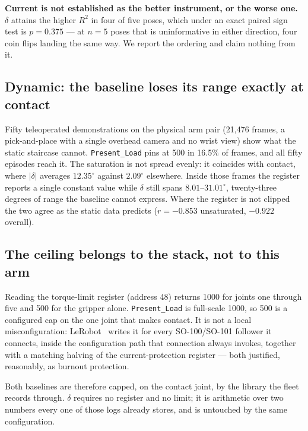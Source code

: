 \documentclass{article}
\begin{document}
\textbf{Current is not established as the better instrument, or the worse
one.} $\delta$ attains the higher $R^2$ in four of five poses, which under an
exact paired sign test is $p = 0.375$ --- at $n = 5$ poses that is
uninformative in either direction, four coin flips landing the same way. We
report the ordering and claim nothing from it.

\subsection{Dynamic: the baseline loses its range exactly at contact}

Fifty teleoperated demonstrations on the physical arm pair (21{,}476 frames,
a pick-and-place with a single overhead camera and no wrist view) show what
the static staircase cannot. \texttt{Present\_Load} pins at 500 in 16.5\% of
frames, and all fifty episodes reach it. The saturation is not spread evenly:
it coincides with contact, where $|\delta|$ averages $12.35^\circ$ against
$2.09^\circ$ elsewhere. Inside those frames the register reports a single
constant value while $\delta$ still spans $8.01$--$31.01^\circ$, twenty-three
degrees of range the baseline cannot express. Where the register is not
clipped the two agree as the static data predicts ($r = -0.853$
unsaturated, $-0.922$ overall).

\subsection{The ceiling belongs to the stack, not to this arm}

Reading the torque-limit register (address 48) returns 1000 for joints one
through five and 500 for the gripper alone. \texttt{Present\_Load} is
full-scale 1000, so 500 is a configured cap on the one joint that makes
contact. It is not a local misconfiguration: LeRobot~\citep{cadene2024lerobot}
writes it for every SO-100/SO-101 follower it connects, inside the
configuration path that connection always invokes, together with a matching
halving of the current-protection register --- both justified, reasonably, as
burnout protection.

Both baselines are therefore capped, on the contact joint, by the library the
fleet records through. $\delta$ requires no register and no limit; it is
arithmetic over two numbers every one of those logs already stores, and is
untouched by the same configuration.
\end{document}
